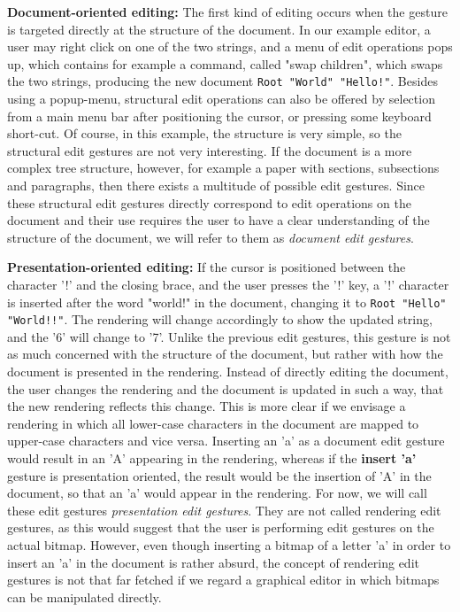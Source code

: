 {\bf Document-oriented editing:} The first kind of editing occurs when the gesture is targeted directly at the structure of the document. In our example editor, a user may right click on one of the two strings, and a menu of edit operations pops up, which contains for example a command, called "swap children", which swaps the two strings, producing the new document \texttt{Root "World" "Hello!"}. Besides using a popup-menu, structural edit operations can also be offered by selection from a main menu bar after positioning the cursor, or pressing some keyboard short-cut. Of course, in this example, the structure is very simple, so the structural edit gestures are not very interesting. If the document is a more complex tree structure, however, for example a paper with sections, subsections and paragraphs, then there exists a multitude of possible edit gestures. Since these structural edit gestures directly correspond to edit operations on the document and their use requires the user to have a clear understanding of the structure of the document, we will refer to them as {\em document edit gestures}. 

{\bf Presentation-oriented editing: }If the cursor is positioned between the character '!' and the closing brace, and the user presses the '!' key, a '!' character is inserted after the word "world!" in the document, changing it to \texttt{Root "Hello" "World!!"}. The rendering will change accordingly to show the updated string, and the '6' will change to '7'. Unlike the previous edit gestures, this gesture is not as much concerned with the structure of the document, but rather with how the document is presented in the rendering. Instead of directly editing the document, the user changes the rendering and the document is updated in such a way, that the new rendering reflects this change. This is more clear if we envisage a rendering in which all lower-case characters in the document are mapped to upper-case characters and vice versa. Inserting an 'a' as a document edit gesture would result in an 'A' appearing in the rendering, whereas if the {\bf insert 'a'} gesture is presentation oriented, the result would be the insertion of 'A' in the document, so that an 'a' would appear in the rendering. For now, we will call these edit gestures {\em presentation edit gestures}. They are not called rendering edit gestures, as this would suggest that the user is performing edit gestures on the actual bitmap. However, even though inserting a bitmap of a letter 'a' in order to insert an 'a' in the document is rather absurd, the concept of rendering edit gestures is not that far fetched if we regard a graphical editor in which bitmaps can be manipulated directly. 

